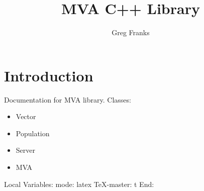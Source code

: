 %
%
%
%
%
%
%
%
%
%
\def\Sec{\mathhexbox278}
\def\leftbracket{\mathhexbox266}
\def\rightbracket{\mathhexbox267}
%
\title{MVA C++ Library}
\author{Greg Franks}
\setcounter{secnumdepth}{3}
\oddsidemargin 18pt
\evensidemargin 18pt
\topmargin 0pt
\textwidth 6.0in
\textheight 8.0in


\maketitle
\clearpage
\tableofcontents
\clearpage
\section{Introduction}
\label{sec:introduction}
Documentation for MVA library.
Classes:
\begin{iftex}
\begin{itemize}
\item Vector
\item Population
\item Server
\item MVA
\end{itemize}
\end{iftex}








\C Local Variables: 
\C mode: latex
\C TeX-master: t
\C End: 
